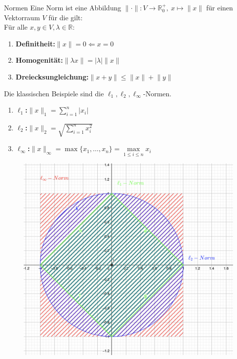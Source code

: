 \begin{titleDef}{Normen}
\label{norm}
Eine Norm ist eine Abbildung $\lVert \cdot\rVert:V\to\mathbb{R}^+_0,\ x\mapsto\lVert x\rVert$ für einen Vektorraum $V$ für die gilt:\\
Für alle $x,y\in V,\lambda\in\mathbb{R}$:
\begin{enumerate}[label=(\arabic*)]
	\item \textbf{Definitheit:}$\lVert x\rVert=0\Leftarrow x=0$
	\item \textbf{Homogenität:}$\lVert \lambda x\rVert=\lvert\lambda\rvert\lVert x\rVert$
	\item \textbf{Dreiecksungleichung:}$\lVert x+y\rVert\leq\lVert x\rVert+\lVert y\rVert$
\end{enumerate}
Die klassischen Beispiele sind die $\ell_1,\ell_2,\ell_\infty$-Normen.
\begin{enumerate}[label=(\arabic*)]
	\item \textbf{$\ell_1$:}$\lVert x\rVert_1=\sum_{i=1}^{n}\lvert x_i\rvert$        
	\item \textbf{$\ell_2$:}$\lVert x\rVert_2=\sqrt{\sum_{i=1}^{n}x_i^2}$   
	\item \textbf{$\ell_\infty$:}$\lVert x\rVert_\infty=\max\{x_1,\ldots,x_n\}=\max\limits_{1\leq i\leq n}x_i$                   
\end{enumerate}
\begin{figure}[h]
	\centering
	\includegraphics[width=\linewidth]{Bilder/Norms}
	\label{normbild}
\end{figure}\par
\end{titleDef}

